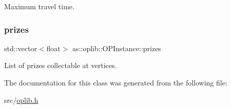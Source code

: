 Maximum travel time. 

\mbox{\label{classas_1_1oplib_1_1OPInstance_ae04b2b823f630159c31d7c3f2f3fcdb5}} 
\subsubsection{\texorpdfstring{prizes}{prizes}}
{\footnotesize\ttfamily std\+::vector$<$float$>$ as\+::oplib\+::\+O\+P\+Instance\+::prizes\hspace{0.3cm}{\ttfamily [protected]}}



List of prizes collectable at vertices. 



The documentation for this class was generated from the following file\+:\begin{DoxyCompactItemize}
\item 
src/\hyperlink{oplib_8h}{oplib.\+h}\end{DoxyCompactItemize}
